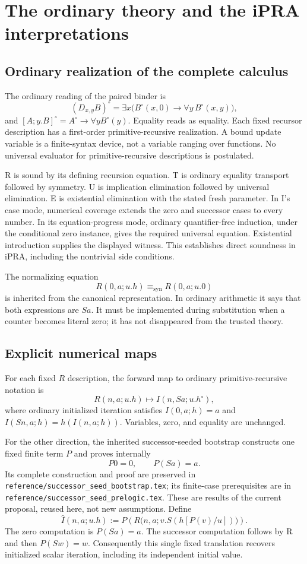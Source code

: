 \documentclass[11pt,letterpaper]{article}
\theoremstyle{definition}\newtheorem{definition}[theorem]{Definition}
\newcommand{\file}[1]{\texttt{\small\nolinkurl{#1}}}
\newcommand{\lit}{\mathrel{\equiv_{\mathrm{syn}}}}
\begin{document}
\section{The ordinary theory and the iPRA interpretations}
\label{sec:interpretations}

\subsection{Ordinary realization of the complete calculus}
The ordinary reading of the paired binder is
\[
 (D_{x,y}B)^\circ
 =\exists x\bigl(B^\circ(x,0)\to\forall y\,B^\circ(x,y)\bigr),
\]
and $[A;y.B]^\circ=A^\circ\to\forall yB^\circ(y)$. Equality reads as equality. Each fixed recursor description has a first-order primitive-recursive realization. A bound update variable is a finite-syntax device, not a variable ranging over functions. No universal evaluator for primitive-recursive descriptions is postulated.

R is sound by its defining recursion equation. T is ordinary equality transport followed by symmetry. U is implication elimination followed by universal elimination. E is existential elimination with the stated fresh parameter. In I's case mode, numerical coverage extends the zero and successor cases to every number. In its equation-progress mode, ordinary quantifier-free induction, under the conditional zero instance, gives the required universal equation. Existential introduction supplies the displayed witness. This establishes direct soundness in iPRA, including the nontrivial side conditions.

The normalizing equation
\[
 R(0,a;u.h)\lit R(0,a;u.0)
\]
is inherited from the canonical representation. In ordinary arithmetic it says that both expressions are $Sa$. It must be implemented during substitution when a counter becomes literal zero; it has not disappeared from the trusted theory.

\subsection{Explicit numerical maps}
For each fixed $R$ description, the forward map to ordinary primitive-recursive notation is
\[
 R(n,a;u.h)\longmapsto I(n,Sa;u.h^\circ),
\]
where ordinary initialized iteration satisfies $I(0,a;h)=a$ and $I(Sn,a;h)=h(I(n,a;h))$. Variables, zero, and equality are unchanged.

For the other direction, the inherited successor-seeded bootstrap constructs one fixed finite term $P$ and proves internally
\[
 P0=0,\qquad P(Sa)=a.
\]
Its complete construction and proof are preserved in \file{reference/successor_seed_bootstrap.tex}; its finite-case prerequisites are in \file{reference/successor_seed_prelogic.tex}. These are results of the current proposal, reused here, not new assumptions. Define
\[
 \widehat I(n,a;u.h)
 :=P\!\left(R\bigl(n,a;v.S(h[P(v)/u])\bigr)\right).
\]
The zero computation is $P(Sa)=a$. The successor computation follows by R and then $P(Sw)=w$. Consequently this single fixed translation recovers initialized scalar iteration, including its independent initial value.
\end{document}
